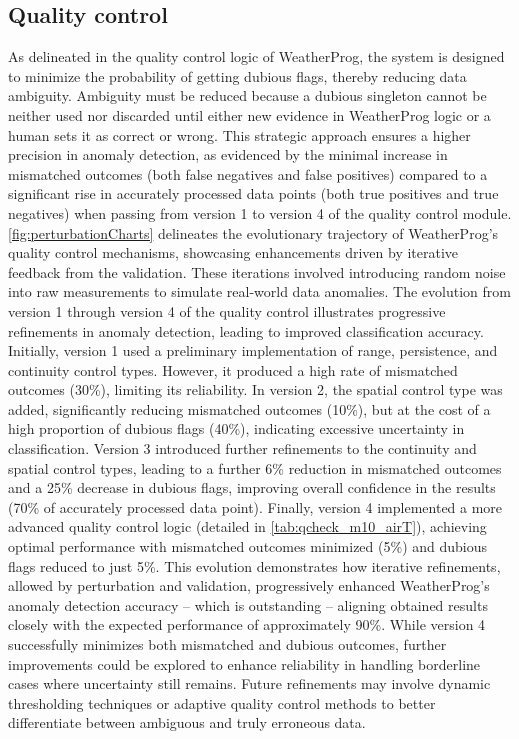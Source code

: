 \documentclass[authoryear,preprint,review,12pt]{elsarticle}
\newcommand{\statusblock}[3]{
    \ifthenelse{\equal{#2}{todo}}
        {\textcolor{red}{#1 (TO DO): #3}}
        {}
    \ifthenelse{\equal{#2}{wip}}
        {\textcolor{magenta}{#1 (IN PROGRESS): #3}}
        {}
    \ifthenelse{\equal{#2}{update}}
        {\textcolor{blue}{#1 (UPDATE): #3}}
        {}
    \ifthenelse{\equal{#2}{review}}
        {\textcolor{cyan}{#1 (REVIEW): #3}}
        {}
    \ifthenelse{\equal{#2}{done}}
        {\textcolor{PineGreen}{#1 (READY): #3}}
        {}
}
\begin{document}
\subsection{Quality control}
As delineated in the quality control logic of WeatherProg, %
the system is designed to minimize the probability of getting dubious flags, thereby reducing data ambiguity.
Ambiguity must be reduced because a dubious singleton cannot be neither used nor discarded until either new evidence in WeatherProg logic or a human sets it as correct or wrong.
This strategic approach ensures a higher precision in anomaly detection, as evidenced by the minimal increase in mismatched outcomes (both false negatives and false positives) compared to a significant rise in accurately processed data points (both true positives and true negatives) when passing from version 1 to version 4 of the quality control module.
\cref{fig:perturbationCharts} delineates the evolutionary trajectory of WeatherProg's quality control mechanisms, showcasing enhancements driven by iterative feedback from the validation. 
These iterations involved introducing random noise into raw measurements to simulate real-world data anomalies. 
The evolution from version 1 through version 4 of the quality control illustrates progressive refinements in anomaly detection, leading to improved classification accuracy. %
Initially, version 1 used a preliminary implementation of range, persistence, and continuity control types. 
However, it produced a high rate of mismatched outcomes (30\%), limiting its reliability.
In version 2, the spatial control type was added, significantly reducing mismatched outcomes (10\%), but at the cost of a high proportion of dubious flags (40\%), indicating excessive uncertainty in classification.
Version 3 introduced further refinements to the continuity and spatial control types, leading to a further 6\% reduction in mismatched outcomes and a 25\% decrease in dubious flags, improving overall confidence in the results (70\% of accurately processed data point).
Finally, version 4 implemented a more advanced quality control logic (detailed in \cref{tab:qcheck_m10_airT}), achieving optimal performance with mismatched outcomes minimized (5\%) and dubious flags reduced to just 5\%.
This evolution demonstrates how iterative refinements, allowed by perturbation and validation, progressively enhanced WeatherProg's anomaly detection accuracy -- which is outstanding -- aligning obtained results closely with the expected performance of approximately 90\%.
While version 4 successfully minimizes both mismatched and dubious outcomes, further improvements could be explored to enhance reliability in handling borderline cases where uncertainty still remains.
Future refinements may involve dynamic thresholding techniques or adaptive quality control methods to better differentiate between ambiguous and truly erroneous data.
\end{document}
